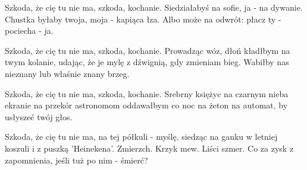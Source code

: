 \begin{text}
    Szkoda, że cię tu nie ma,
    szkoda, kochanie.
    Siedziałabyś na sofie,
    ja - na dywanie.
    Chustka byłaby twoja,
    moja - kapiąca łza.
    Albo może na odwrót:
    płacz ty - pociecha - ja.

    Szkoda, że cię tu nie ma,
    szkoda, kochanie.
    Prowadząc wóz, dłoń kładłbym
    na twym kolanie,
    udając, że je mylę
    z dźwignią, gdy zmieniam bieg.
    Wabiłby nas nieznany
    lub właśnie znany brzeg.

    Szkoda, że cię tu nie ma,
    szkoda, kochanie.
    Srebrny księżyc na czarnym
    nieba ekranie
    na przekór astronomom
    oddawałbym co noc
    na żeton na automat,
    by usłyszeć twój głos.

    Szkoda, że cię tu nie ma,
    na tej półkuli -
    myślę, siedząc na ganku w letniej koszuli
    i z puszką 'Heinekena'.
    Zmierzch. Krzyk mew. Liści szmer.
    Co za zysk z zapomnienia,
    jeśli tuż po nim - śmierć?
\end{text}
\begin{chord}

\end{chord}
